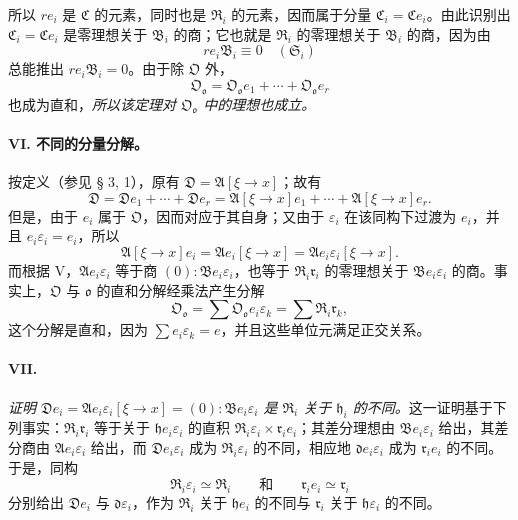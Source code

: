 所以 $r e_i$ 是 $\mathfrak C$ 的元素，同时也是 $\mathfrak R_i$ 的元素，因而属于分量 $\mathfrak C_i=\mathfrak C e_i$。由此识别出 $\mathfrak C_i=\mathfrak C e_i$ 是零理想关于 $\mathfrak B_i$ 的商；它也就是 $\mathfrak R_i$ 的零理想关于 $\mathfrak B_i$ 的商，因为由
\[
r e_i\mathfrak B_i\equiv0\quad(\mathfrak S_i)
\]
总能推出 $r e_i\mathfrak B_i=0$。由于除 $\mathfrak O$ 外，
\[
\mathfrak O_{\mathfrak o}=\mathfrak O_{\mathfrak o}e_1+\cdots+\mathfrak O_{\mathfrak o}e_r
\]
也成为直和，\emph{所以该定理对 $\mathfrak O_{\mathfrak o}$ 中的理想也成立。}

\paragraph{VI. 不同的分量分解。}
按定义（参见 § 3, 1），原有 $\mathfrak D=\mathfrak A[\xi\to x]$；故有
\[
\mathfrak D=\mathfrak D e_1+\cdots+\mathfrak D e_r
=\mathfrak A[\xi\to x]e_1+\cdots+\mathfrak A[\xi\to x]e_r.
\]
但是，由于 $e_i$ 属于 $\mathfrak O$，因而对应于其自身；又由于 $\varepsilon_i$ 在该同构下过渡为 $e_i$，并且 $e_i\varepsilon_i=e_i$，所以
\[
\mathfrak A[\xi\to x]e_i=\mathfrak A e_i[\xi\to x]
=\mathfrak A e_i\varepsilon_i[\xi\to x].
\]
而根据 V，$\mathfrak A e_i\varepsilon_i$ 等于商 $(0):\mathfrak B e_i\varepsilon_i$，也等于 $\mathfrak R_i\mathfrak r_i$ 的零理想关于 $\mathfrak B e_i\varepsilon_i$ 的商。事实上，$\mathfrak O$ 与 $\mathfrak o$ 的直和分解经乘法产生分解
\[
\mathfrak O_{\mathfrak o}=\sum\mathfrak O_{\mathfrak o}e_i\varepsilon_k
=\sum\mathfrak R_i\mathfrak r_k,
\]
这个分解是直和，因为 $\sum e_i\varepsilon_k=e$，并且这些单位元满足正交关系。

\paragraph{VII.}
\emph{证明 $\mathfrak D e_i=\mathfrak A e_i\varepsilon_i[\xi\to x]=(0):\mathfrak B e_i\varepsilon_i$ 是 $\mathfrak R_i$ 关于 $\mathfrak h_i$ 的不同。}这一证明基于下列事实：$\mathfrak R_i\mathfrak r_i$ 等于关于 $\mathfrak h e_i\varepsilon_i$ 的直积 $\mathfrak R_i\varepsilon_i\times\mathfrak r_i e_i$；其差分理想由 $\mathfrak B e_i\varepsilon_i$ 给出，其差分商由 $\mathfrak A e_i\varepsilon_i$ 给出，而 $\mathfrak D e_i\varepsilon_i$ 成为 $\mathfrak R_i\varepsilon_i$ 的不同，相应地 $\mathfrak d e_i\varepsilon_i$ 成为 $\mathfrak r_i e_i$ 的不同。于是，同构
\[
\mathfrak R_i\varepsilon_i\simeq\mathfrak R_i
\qquad\text{和}\qquad
\mathfrak r_i e_i\simeq\mathfrak r_i
\]
分别给出 $\mathfrak D e_i$ 与 $\mathfrak d\varepsilon_i$，作为 $\mathfrak R_i$ 关于 $\mathfrak h e_i$ 的不同与 $\mathfrak r_i$ 关于 $\mathfrak h\varepsilon_i$ 的不同。

